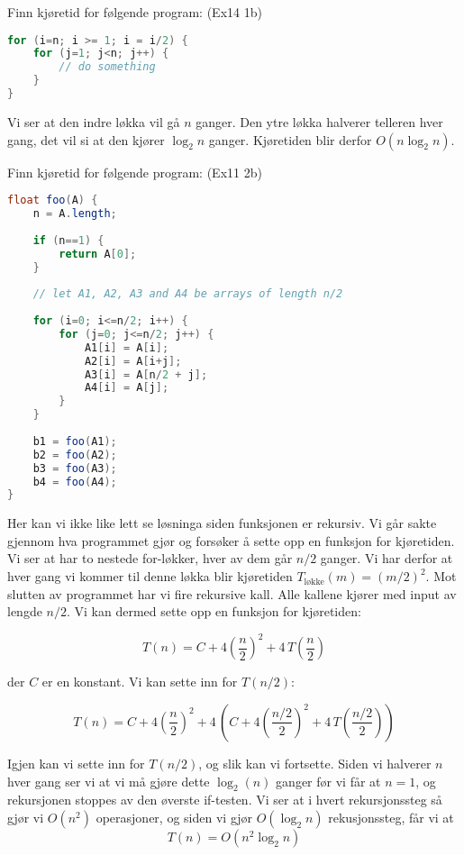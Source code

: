 \begin{example} Finn kjøretid for følgende program: (Ex14 1b)

\begin{lstlisting}[language=Java,
commentstyle=\color{source_brown}\monofontitalic, 
morekeywords={String},
keywordstyle=\color{source_blue}\monofontbold,
stringstyle=\color{source_orange}]
for (i=n; i >= 1; i = i/2) {
    for (j=1; j<n; j++) {
        // do something
    }
}
\end{lstlisting}
Vi ser at den indre løkka vil gå $ n $ ganger. Den ytre løkka halverer telleren hver gang, det vil si at den kjører $ \log_2 n $ ganger. Kjøretiden blir derfor $ O(n\log_2 n) $.
\end{example}

\begin{example} Finn kjøretid for følgende program: (Ex11 2b)
\begin{lstlisting}[language=Java,
commentstyle=\color{source_brown}\monofontitalic, 
morekeywords={String},
keywordstyle=\color{source_blue}\monofontbold,
stringstyle=\color{source_orange}]
float foo(A) {
    n = A.length;
    
    if (n==1) {
        return A[0];
    }
    
    // let A1, A2, A3 and A4 be arrays of length n/2
    
    for (i=0; i<=n/2; i++) {
        for (j=0; j<=n/2; j++) {
            A1[i] = A[i];
            A2[i] = A[i+j];
            A3[i] = A[n/2 + j];
            A4[i] = A[j];
        }
    }
	
    b1 = foo(A1);
    b2 = foo(A2);
    b3 = foo(A3);
    b4 = foo(A4);
}
\end{lstlisting}

Her kan vi ikke like lett se løsninga siden funksjonen er rekursiv. Vi går sakte gjennom hva programmet gjør og forsøker å sette opp en funksjon for kjøretiden. Vi ser at  har to nestede for-løkker, hver av dem går $ n/2 $ ganger. Vi har derfor at hver gang vi kommer til denne løkka blir kjøretiden $ T_{\text{løkke}}(m) = (m/2)^2 $. Mot slutten av programmet har vi fire rekursive kall. Alle kallene kjører  med input av lengde $ n/2 $. Vi kan dermed sette opp en funksjon for kjøretiden:

\[ T(n) = C + 4\left(\frac{n}{2}\right)^2 + 4\,T\left(\frac{n}{2}\right) \]

\noindent der $ C $ er en konstant.  Vi kan sette inn for $ T(n/2) $:

\[ T(n) = C + 4\left(\frac{n}{2}\right)^2 + 4\,\left(C + 4\left(\frac{n/2}{2}\right)^2 + 4\,T\left(\frac{n/2}{2}\right)\right)  \]

Igjen kan vi sette inn for $ T(n/2) $, og slik kan vi fortsette. Siden vi halverer $ n $ hver gang ser vi at vi må gjøre dette $ \log_2(n) $ ganger før vi får at $ n=1 $, og rekursjonen stoppes av den øverste if-testen. Vi ser at i hvert rekursjonssteg så gjør vi $ O(n^2) $ operasjoner, og siden vi gjør $ O(\log_2 n) $ rekusjonssteg, får vi at
\[ T(n) = O(n^2 \log_2 n) \]
\end{example}